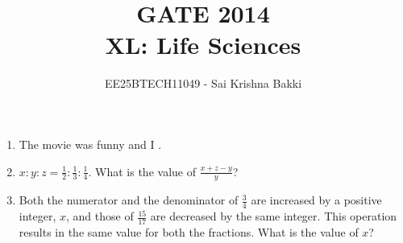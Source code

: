 \documentclass[journal,12pt,onecolumn]{IEEEtran}
\theoremstyle{remark}
\begin{document}
\title{
 GATE 2014 \\
XL: Life Sciences}
\author{EE25BTECH11049 - Sai Krishna Bakki}
\date{}
\maketitle

\begin{enumerate}
    \item The movie was funny and I \underline{\hspace{2cm}}.

    \hfill{}
    \begin{enumerate}
    \end{enumerate}

    \item $x \colon y \colon z = \frac{1}{2} \colon \frac{1}{3} \colon \frac{1}{4}$. What is the value of $\frac{x+z-y}{y}$?

    \hfill{}
    \begin{enumerate}
    \end{enumerate}

    \item Both the numerator and the denominator of $\frac{3}{4}$ are increased by a positive integer, $x$, and those of $\frac{15}{17}$ are decreased by the same integer. This operation results in the same value for both the fractions. What is the value of $x$?

    \hfill{}
    \begin{enumerate}
    \end{enumerate}


\end{enumerate}
\end{document}
